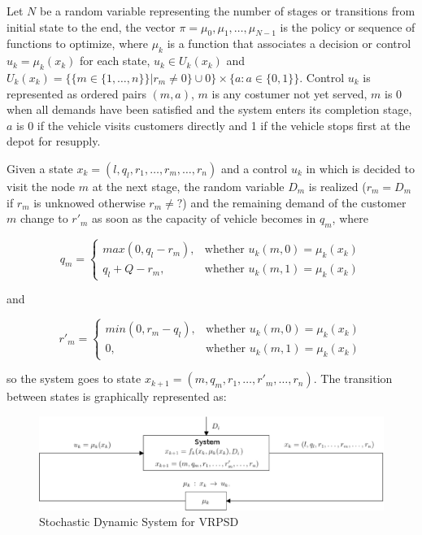 Let $N$ be a random variable representing the number of stages or transitions from initial state to the end, the vector $\pi = {\mu_0, \mu_1,\ldots, \mu_{N-1}}$ is the policy or sequence of functions to optimize, where $\mu_k$ is a function that associates a decision or control $u_k=\mu_k(x_k)$ for each state, $u_k \in U_k(x_k)$ and $U_k(x_k) = \{\{m \in \{1,\ldots,n\}\}|r_m\neq0\}\cup 0\} \times \{a:a \in \{0,1\}\}$. Control $u_k$ is represented as ordered pairs $(m,a)$, $m$ is any costumer not yet served, $m$ is 0 when all demands have been satisfied and the system enters its completion stage, $a$ is 0 if the vehicle visits customers directly and 1 if the vehicle stops first at the depot for resupply.

Given a state $x_k=(l,q_l,r_1,\ldots,r_m,\ldots,r_n)$ and a control $u_k$ in which is decided to visit the node $m$ at the next stage, the random variable $D_m$ is realized ($r_m = D_m$ if $r_m$ is unknowed otherwise $r_m \neq ?$) and the remaining demand of the customer $m$ change to $r'_m$ as soon as the capacity of vehicle becomes in $q_m$, where

\begin{equation}\label{eq:q_m}
    q_m = \left \{ \begin{array}{ll}
    max(0,q_l-r_m), & \text{whether } u_k(m,0)=\mu_k(x_k)\\
    q_l+Q-r_m, & \text{whether } u_k(m,1)=\mu_k(x_k)
    \end{array} \right.
 \end{equation}

and

\begin{equation}\label{eq:r_m}
    r'_m = \left \{ \begin{array}{ll}
    min(0,r_m - q_l), & \text{whether } u_k(m,0)=\mu_k(x_k)\\
    0, & \text{whether } u_k(m,1)=\mu_k(x_k)
    \end{array} \right.
 \end{equation}

so the system goes to state $x_{k+1} = (m,q_m,r_1,\ldots,r'_m,\ldots,r_n)$. The transition between states is graphically represented as:

\begin{figure}[!htbp]
  \begin{center}
   \includegraphics[width=1\textwidth]{Images/Chapter2/System_SDP.eps}
  \end{center}
    \caption{Stochastic Dynamic System for VRPSD}\label{fig:SDPS_VRPSD}
\end{figure}

